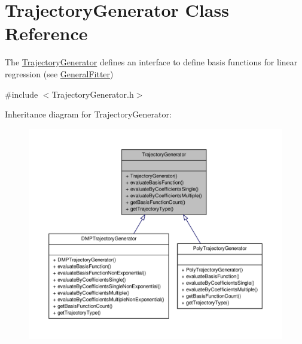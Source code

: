 \hypertarget{classTrajectoryGenerator}{\section{\-Trajectory\-Generator \-Class \-Reference}
\label{classTrajectoryGenerator}
}


\-The \hyperlink{classTrajectoryGenerator}{\-Trajectory\-Generator} defines an interface to define basis functions for linear regression (see \hyperlink{classGeneralFitter}{\-General\-Fitter})  




{\ttfamily \#include $<$\-Trajectory\-Generator.\-h$>$}



\-Inheritance diagram for \-Trajectory\-Generator\-:\nopagebreak
\begin{figure}[H]
\begin{center}
\leavevmode
\includegraphics[width=350pt]{classTrajectoryGenerator__inherit__graph}
\end{center}
\end{figure}
